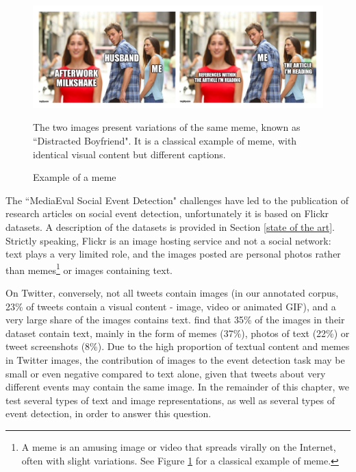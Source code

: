 \begin{figure}
\begin{center}
\includegraphics[width=1\textwidth]{figures/distracted_boyfriend.png}
\end{center}
{\scriptsize The two images present variations of the same meme, known as ``Distracted Boyfriend". It is a classical example of meme, with identical visual content but different captions.
}
\caption{Example of a meme}
\label{Figure:meme}
\end{figure}

The ``MediaEval Social Event Detection" challenges \cite{reuter2013social, petkos2014social} have led to the publication of research articles on social event detection, unfortunately it is based on Flickr datasets. A description of the datasets is provided in Section \ref{state of the art}. Strictly speaking, Flickr is an image hosting service and not a social network: text plays a very limited role, and the images posted are personal photos rather than memes\footnote{A meme is an amusing image or video that spreads virally on the Internet, often with slight variations. See Figure \ref{Figure:meme} for a classical example of meme.} or images containing text.  

On Twitter, conversely, not all tweets contain images (in our annotated corpus, 23\% of tweets contain a visual
content - image, video or animated GIF), and a very large share of the images contains text. \citet{chen2016context} find that 35\% of the images in their dataset contain text, mainly in the form of memes (37\%), photos of text (22\%) or tweet screenshots (8\%). Due to the high proportion of textual content and memes in Twitter images, the contribution of images to the event detection task may be small or even negative compared to text alone, given that tweets about very different events may contain the same image. In the remainder of this chapter, we test several types of text and image representations, as well as several types of event detection, in order to answer this question.


